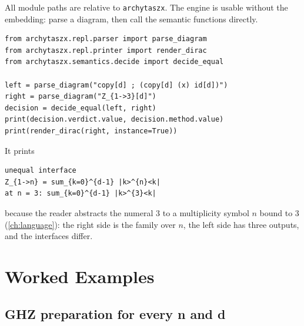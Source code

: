 All module paths are relative to \texttt{archytaszx}. The engine is usable without the embedding: parse a diagram, then call the semantic functions directly.
\begin{lstlisting}[style=python]
from archytaszx.repl.parser import parse_diagram
from archytaszx.repl.printer import render_dirac
from archytaszx.semantics.decide import decide_equal

left = parse_diagram("copy[d] ; (copy[d] (x) id[d])")
right = parse_diagram("Z_{1->3}[d]")
decision = decide_equal(left, right)
print(decision.verdict.value, decision.method.value)
print(render_dirac(right, instance=True))
\end{lstlisting}
It prints
\begin{lstlisting}[style=grammar]
unequal interface
Z_{1->n} = sum_{k=0}^{d-1} |k>^{n}<k|
at n = 3: sum_{k=0}^{d-1} |k>^{3}<k|
\end{lstlisting}
because the reader abstracts the numeral 3 to a multiplicity symbol $n$ bound to 3 (\cref{ch:language}): the right side is the family over $n$, the left side has three outputs, and the interfaces differ.

\section{Worked Examples}\label{sec:python-api-examples}

\subsection{GHZ preparation for every n and d}

